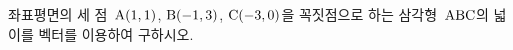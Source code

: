 좌표평면의 세 점~$\mathrm{A}(1{,}\mkern3mu\mathopen{}1)$, $\mathrm{B}(-1{,}\mkern3mu\mathopen{}3)$, $\mathrm{C}(-3{,}\mkern3mu\mathopen{}0)$을 꼭짓점으로 하는 삼각형~$\mathrm{ABC}$의 넓이를 벡터를 이용하여 구하시오.
